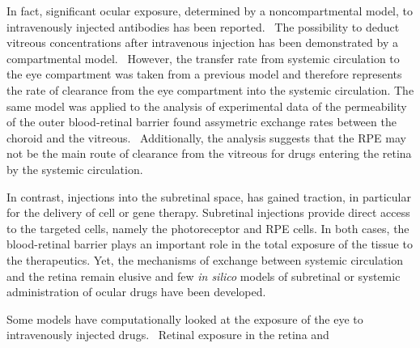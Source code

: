\documentclass[12pt,a4paper]{journal}
\begin{document}
In fact, significant ocular exposure, determined by a noncompartmental model, to intravenously injected antibodies has been reported.~\cite{Shivva_2021}
The possibility to deduct vitreous concentrations after intravenous injection has been demonstrated by a compartmental model.~\cite{Vellonen_2015}
However, the transfer rate from systemic circulation to the eye compartment was taken from a previous model and therefore represents the rate of clearance from the eye compartment into the systemic circulation.
The same model was applied to the analysis of experimental data of the permeability of the outer blood-retinal barrier found assymetric exchange rates between the choroid and the vitreous.~\cite{Ramsay_2019}
Additionally, the analysis suggests that the RPE may not be the main route of clearance from the vitreous for drugs entering the retina by the systemic circulation.~\cite{Ramsay_2019}


In contrast, injections into the subretinal space, has gained traction, in particular for the delivery of cell or gene therapy.
Subretinal injections provide direct access to the targeted cells, namely the photoreceptor and RPE cells.
In both cases, the blood-retinal barrier plays an important role in the total exposure of the tissue to the therapeutics.
Yet, the mechanisms of exchange between systemic circulation and the retina remain elusive and few \textit{in silico} models of subretinal or systemic administration of ocular drugs have been developed.


Some models have computationally looked at the exposure of the eye to intravenously injected drugs.~\cite{Shivva_2021,Vellonen_2015}
Retinal exposure in the retina and 




\end{document}
